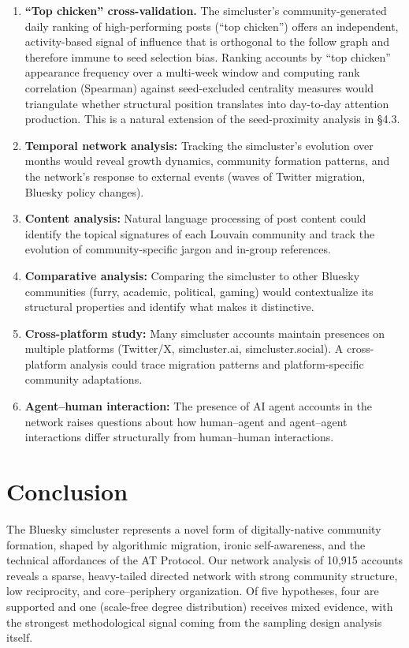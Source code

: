 \documentclass[11pt,a4paper]{article}
\begin{document}
\begin{enumerate}[leftmargin=*]
    \item \textbf{``Top chicken'' cross-validation.} The simcluster's community-generated daily ranking of high-performing posts (``top chicken'') offers an independent, activity-based signal of influence that is orthogonal to the follow graph and therefore immune to seed selection bias. Ranking accounts by ``top chicken'' appearance frequency over a multi-week window and computing rank correlation (Spearman) against seed-excluded centrality measures would triangulate whether structural position translates into day-to-day attention production. This is a natural extension of the seed-proximity analysis in \S4.3.
    \item \textbf{Temporal network analysis:} Tracking the simcluster's evolution over months would reveal growth dynamics, community formation patterns, and the network's response to external events (waves of Twitter migration, Bluesky policy changes).
    \item \textbf{Content analysis:} Natural language processing of post content could identify the topical signatures of each Louvain community and track the evolution of community-specific jargon and in-group references.
    \item \textbf{Comparative analysis:} Comparing the simcluster to other Bluesky communities (furry, academic, political, gaming) would contextualize its structural properties and identify what makes it distinctive.
    \item \textbf{Cross-platform study:} Many simcluster accounts maintain presences on multiple platforms (Twitter/X, simcluster.ai, simcluster.social). A cross-platform analysis could trace migration patterns and platform-specific community adaptations.
    \item \textbf{Agent--human interaction:} The presence of AI agent accounts in the network raises questions about how human--agent and agent--agent interactions differ structurally from human--human interactions.
\end{enumerate}

\section{Conclusion}

The Bluesky simcluster represents a novel form of digitally-native community formation, shaped by algorithmic migration, ironic self-awareness, and the technical affordances of the AT Protocol. Our network analysis of 10,915 accounts reveals a sparse, heavy-tailed directed network with strong community structure, low reciprocity, and core--periphery organization. Of five hypotheses, four are supported and one (scale-free degree distribution) receives mixed evidence, with the strongest methodological signal coming from the sampling design analysis itself.
\end{document}
